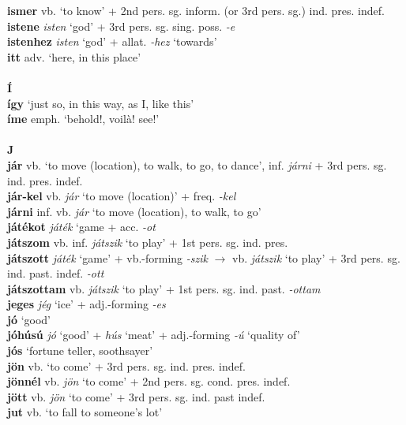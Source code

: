 \documentclass[11pt]{article}
\begin{document}
\textbf{ismer} vb. `to know'  + 2nd pers. sg. inform. (or 3rd
pers. sg.) ind. pres. indef.\\
\textbf{istene} \emph{isten} `god' + 3rd
pers. sg. sing. poss. \emph{-e} \\
\textbf{istenhez} \emph{isten} `god' + allat. \emph{-hez} `towards' \\
\textbf{itt} adv. `here, in this place' \\
\ \\
\noindent \textbf{\large Í} \\
\textbf{így} `just so, in this way, as I, like this' \\
\textbf{íme} emph. `behold!, voilà! see!' \\
\ \\
\noindent \textbf{\large J} \\
\textbf{jár} vb. `to move (location), to walk, to go, to dance',
inf. \emph{járni} + 3rd pers. sg. ind. pres. indef. \\
\textbf{jár-kel} vb. \emph{jár} `to move (location)' +
freq. \emph{-kel} \\
\textbf{járni} inf. vb. \emph{jár}  `to move (location), to walk, to
go' \\
\textbf{játékot} \emph{játék} `game + acc. \emph{-ot} \\
\textbf{játszom} vb. inf. \emph{játszik} `to play' + 1st
pers. sg. ind. pres. \\
\textbf{játszott} \emph{játék} `game' + vb.\hyp{}forming \emph{-szik}
$\rightarrow$ vb. \emph{játszik} `to play' +
3rd pers. sg. ind. past. indef. \emph{-ott} \\
\textbf{játszottam} vb. \emph{játszik} `to play' + 1st
pers. sg. ind. past. \emph{-ottam} \\
\textbf{jeges} \emph{jég} `ice' + adj.\hyp{}forming \emph{-es} \\
\textbf{jó} `good' \\
\textbf{jóhúsú} \emph{jó} `good' + \emph{hús} `meat' +
adj.\hyp{}forming \emph{-ú} `quality of' \\
\textbf{jós} `fortune teller, soothsayer' \\
\textbf{jön} vb. `to come' + 3rd pers. sg. ind. pres. indef. \\
\textbf{jönnél} vb. \emph{jön} `to come' + 2nd pers. sg.
cond. pres. indef. \\
\textbf{jött} vb. \emph{jön} `to come' + 3rd pers. sg. ind. past
indef. \\
\textbf{jut} vb. `to fall to someone's lot' \\
\end{document}
